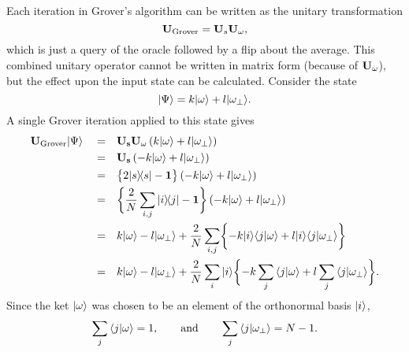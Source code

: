 Each iteration in Grover's algorithm can be written as
the unitary transformation
\begin{equation}
{\bf U}_{\text{Grover}} = {\bf U}_s {\bf U}_\omega,
\end{equation}
which is just a query of the oracle followed by a flip
about the average.
This combined unitary operator cannot be written in matrix
form (because of ${\bf U_\omega}$), but the effect upon
the input state can be calculated.
Consider the state
\begin{equation}
{|{\Psi}\rangle} = k{|{\omega}\rangle} + l{|{\omega_\perp}\rangle}.
\end{equation}
A single Grover iteration applied to this state
gives
\begin{equation}
\begin{split}
{\bf U}_{\text{Grover}}{|{\Psi}\rangle}
\quad =&\quad  {\bf U_s}{\bf U_\omega} \left(
                k{|{\omega}\rangle} + l{|{\omega_\perp}\rangle}
             \right) \\
=&\quad  {\bf U_s} \left(
               -k{|{\omega}\rangle} + l{|{\omega_\perp}\rangle}
             \right) \\
=&\quad \bigl\lbrace 2{|{s}\rangle\!\langle{s}|} - {\bf 1} \bigr\rbrace
             \left(
                -k{|{\omega}\rangle} + l{|{\omega_\perp}\rangle}
             \right) \\
=&\quad \biggl\lbrace 
                    \frac{2}{N} \sum_{i,j}{|{i}\rangle\!\langle{j}|}
                    - {\bf 1} \biggr\rbrace
             \left(
                -k{|{\omega}\rangle} + l{|{\omega_\perp}\rangle}
             \right) \\
=&\quad 
                k{|{\omega}\rangle} - l{|{\omega_\perp}\rangle}
                + \frac{2}{N} \sum_{i,j} \biggl\lbrace
                                    - k{|{i}\rangle}{\langle{j}|{\omega}\rangle}
                                    + l{|{i}\rangle}{\langle{j}|{\omega_\perp}\rangle}
                              \biggr\rbrace \\
=&\quad 
                k{|{\omega}\rangle} - l{|{\omega_\perp}\rangle}
                + \frac{2}{N} \sum_i {|{i}\rangle} \biggl\lbrace
                                    - k\sum_j{\langle{j}|{\omega}\rangle}
                                    + l\sum_j{\langle{j}|{\omega_\perp}\rangle}
                              \biggr\rbrace.
\end{split}
\end{equation}
Since the ket ${|{\omega}\rangle}$ was chosen to be an element of the orthonormal
basis ${|{i}\rangle}$,
\begin{equation}
\sum_j {\langle{j}|{\omega}\rangle} = 1,\qquad\text{and}\qquad
\sum_j {\langle{j}|{\omega_\perp}\rangle} = N-1.
\end{equation}
